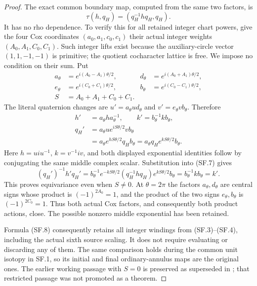 \begin{proof}
The exact common boundary map, computed from the same two factors,
is
\[
               \tau(h,q_H)=(q_H^{-1}hq_H,q_H).             \tag{SF.7}
\]
It has no rho dependence. To verify this for all retained integer
chart powers, give the four Cox coordinates \((a_0,a_1,c_0,c_1)\)
their actual integer weights \((A_0,A_1,C_0,C_1)\). Such integer
lifts exist because the auxiliary-circle vector \((1,1,-1,-1)\)
is primitive; the quotient cocharacter lattice is free. We impose
no condition on their sum. Put
\[
 \begin{aligned}
 a_\theta&=e^{i(A_0-A_1)\theta/2},&
 d_\theta&=e^{i(A_0+A_1)\theta/2},\\
 e_\theta&=e^{i(C_0+C_1)\theta/2},&
 b_\theta&=e^{i(C_0-C_1)\theta/2},\\
 S&=A_0+A_1+C_0+C_1.
 \end{aligned}
\]
The literal quaternion changes are
\(u'=a_\theta u d_\theta\) and
\(v'=e_\theta v b_\theta\). Therefore
\[
 \begin{split}
 h'&=a_\theta h a_\theta^{-1},\qquad
 k'=b_\theta^{-1}k b_\theta,\\
 q_H'&=a_\theta u e^{iS\theta/2}v b_\theta\\
     &=a_\theta e^{hS\theta/2}q_H b_\theta
       =a_\theta q_H e^{kS\theta/2}b_\theta .
 \end{split}                                             \tag{SF.8}
\]
Here \(h=u i u^{-1}\), \(k=v^{-1}iv\), and both displayed
exponential identities follow by conjugating the same middle
complex scalar. Substitution into (SF.7) gives
\[
 (q_H')^{-1}h'q_H'
 =b_\theta^{-1}e^{-kS\theta/2}
              (q_H^{-1}h q_H)e^{kS\theta/2}b_\theta
 =b_\theta^{-1}k b_\theta=k'.
\]
This proves equivariance even when \(S\ne0\). At \(\theta=2\pi\)
the factors \(a_\theta,d_\theta\) are central signs whose product
is \((-1)^{2A_0}=1\), and the product of the two signs
\(e_\theta,b_\theta\) is \((-1)^{2C_0}=1\). Thus both actual Cox
factors, and consequently both product actions, close. The possible
nonzero middle exponential has been retained.

Formula (SF.8) consequently retains all integer windings from
(SF.3)--(SF.4), including the actual sixth source scaling. It does not
require evaluating or discarding any of them. The same comparison
holds during the common unit isotopy in SF.1, so its initial and
final ordinary-annulus maps are the original ones. The earlier
working passage with \(S=0\) is preserved as superseded in
;
that restricted passage was not promoted as a theorem.


\end{proof}
